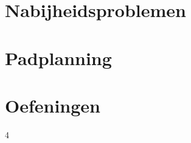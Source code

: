 \documentclass[12pt,a4paper]{article}
\begin{document}
\part{Nabijheidsproblemen}



\part{Padplanning}


\part{Oefeningen}




4





\end{document}
